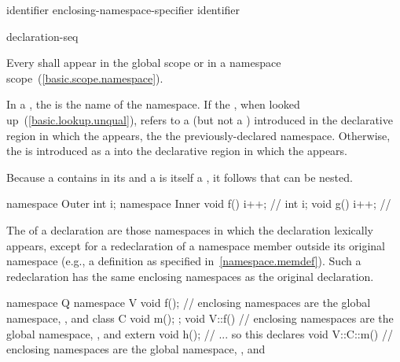 \begin{bnf}
\br
        identifier\br
        enclosing-namespace-specifier \terminal{::} identifier
\end{bnf}

\begin{bnf}
\br
        declaration-seq\opt
\end{bnf}

\pnum
Every  shall appear in the global scope
or in a namespace scope~(\ref{basic.scope.namespace}).

\pnum
In a ,
the  is the name of the namespace.
If the , when looked up~(\ref{basic.lookup.unqual}),
refers to a  (but not a )
introduced in the declarative region
in which the  appears,
the 
 the previously-declared namespace.
Otherwise, the  is introduced
as a  into the declarative region
in which the  appears.

\pnum
Because a  contains
 in its  and a
 is itself a , it
follows that  can be nested.
\enterexample

\begin{codeblock}
namespace Outer {
  int i;
  namespace Inner {
    void f() { i++; }           // 
    int i;
    void g() { i++; }           // 
  }
}
\end{codeblock}
\exitexample

\pnum
The  of a declaration are those
namespaces in which the declaration lexically appears, except for a
redeclaration of a namespace member outside its original namespace
(e.g., a definition as specified in~\ref{namespace.memdef}). Such a
redeclaration has the same enclosing namespaces as the original
declaration.
\enterexample
\begin{codeblock}
namespace Q {
  namespace V {
    void f();   // enclosing namespaces are the global namespace, , and 
    class C { void m(); };
  }
  void V::f() { // enclosing namespaces are the global namespace, , and 
    extern void h();  // ... so this declares 
  }
  void V::C::m() { // enclosing namespaces are the global namespace, , and 
  }
}
\end{codeblock}
\exitexample

